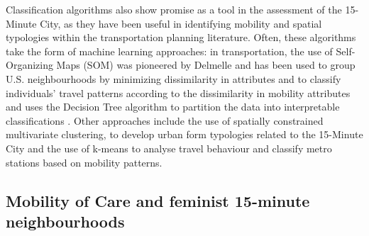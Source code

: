 \documentclass[
  authoryear,
  preprint,
  3p]{elsarticle}
\begin{document}
Classification algorithms also show promise as a tool in the assessment
of the 15-Minute City, as they have been useful in identifying mobility
and spatial typologies within the transportation planning literature.
Often, these algorithms take the form of machine learning approaches: in
transportation, the use of Self-Organizing Maps (SOM) was pioneered by
Delmelle \citeyearpar{delmelle_spatial_2012} and has been used to group
U.S. neighbourhoods by minimizing dissimilarity in attributes
\citep{delmelleDifferentiatingPathwaysNeighborhood2017} and to classify
individuals' travel patterns according to the dissimilarity in mobility
attributes and uses the Decision Tree algorithm to partition the data
into interpretable classifications \citep{victorianoTimeSpaceMoney2020}.
Other approaches include the use of spatially constrained multivariate
clustering, to develop urban form typologies related to the 15-Minute
City \citep{burkeGeospatialAnalysisFramework2022} and the use of k-means
to analyse travel behaviour and classify metro stations based on
mobility patterns\citep{ganUnderstandingUrbanMobility2020}.

\subsection{Mobility of Care and feminist 15-minute
neighbourhoods}\label{mobility-of-care-and-feminist-15-minute-neighbourhoods}
\end{document}
